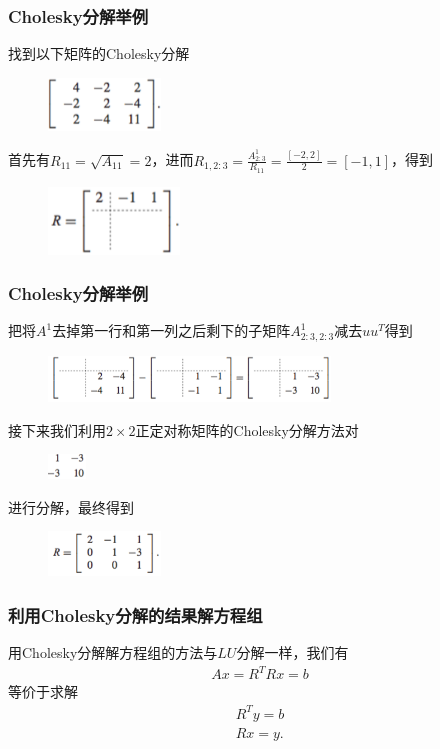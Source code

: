 \documentclass[10pt]{beamer}
\begin{document}
\begin{frame}
\frametitle{Cholesky分解举例}
找到以下矩阵的Cholesky分解
\begin{figure}
\includegraphics[width=3cm]{figs/2_5_Cholesky-Examp-1} 
\end{figure}
首先有$R_{11} = \sqrt{A_{11}} = 2$，进而$R_{1, 2:3} = \frac{A^1_{2 : 3}}{R_{11}}= \frac{[-2,2]}{2} = [-1,1]$，得到
\begin{figure}
\includegraphics[width=3.5cm]{figs/2_5_Cholesky-Examp-2} 
\end{figure}
\end{frame}

\begin{frame}
\frametitle{Cholesky分解举例}
把将$A^1$去掉第一行和第一列之后剩下的子矩阵$A^1_{2:3, 2:3}$减去$uu^T$得到
\begin{figure}
\includegraphics[width=7.5cm]{figs/2_5_Cholesky-Examp-3} 
\end{figure}
接下来我们利用$2\times2$正定对称矩阵的Cholesky分解方法对
\begin{figure}
\includegraphics[width=1cm]{figs/2_5_Cholesky-Examp-4} 
\end{figure}
进行分解，最终得到
\begin{figure}
\includegraphics[width=3cm]{figs/2_5_Cholesky-Examp-5} 
\end{figure}
\end{frame}


\begin{frame}
\frametitle{利用Cholesky分解的结果解方程组}
用Cholesky分解解方程组的方法与$LU$分解一样，我们有
\begin{align}
Ax = R^TR x = b
\end{align}
等价于求解
\begin{align}
R^T y = b \nonumber \\
R x = y.
\end{align}
\end{frame}
\end{document}

